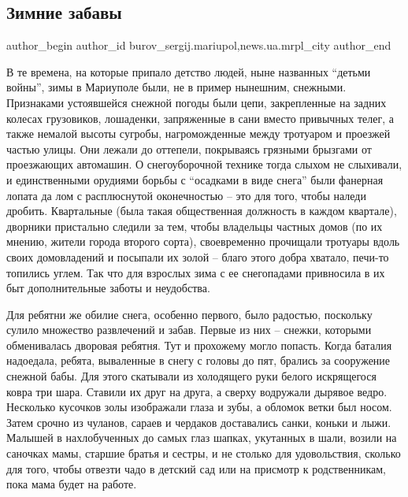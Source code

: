  
 
 
 
 
 
\subsection{Зимние забавы}
\label{sec:20_01_2018.stz.news.ua.mrpl_city.1.zimnie_zabavy}
 
\ifcmt
 author_begin
   author_id burov_sergij.mariupol,news.ua.mrpl_city
 author_end
\fi

В те времена, на которые припало детство людей, ныне названных \enquote{детьми войны},
зимы в Мариуполе были, не в пример нынешним, снежными. Признаками устоявшейся
снежной погоды были цепи, закрепленные на задних колесах грузовиков, лошаденки,
запряженные в сани вместо привычных телег, а также немалой высоты сугробы,
нагроможденные между тротуаром и проезжей частью улицы. Они лежали до оттепели,
покрываясь грязными брызгами от проезжающих автомашин. О снегоуборочной технике
тогда слыхом не слыхивали, и единственными орудиями борьбы с \enquote{осадками в виде
снега} были фанерная лопата да лом с расплюснутой оконечностью – это для того,
чтобы наледи дробить. Квартальные (была такая общественная должность в каждом
квартале), дворники пристально следили за тем, чтобы владельцы частных домов
(по их мнению, жители города второго сорта), своевременно прочищали тротуары
вдоль своих домовладений и посыпали их золой – благо этого добра хватало,
печи-то топились углем. Так что для взрослых зима с ее снегопадами привносила в
их быт дополнительные заботы и неудобства.

Для ребятни же обилие снега, особенно первого, было радостью, поскольку сулило
множество развлечений и забав. Первые из них – снежки, которыми обменивалась
дворовая ребятня. Тут и прохожему могло попасть. Когда баталия надоедала,
ребята, вываленные в снегу с головы до пят, брались за сооружение снежной бабы.
Для этого скатывали из холодящего руки белого искрящегося ковра три шара.
Ставили их друг на друга, а сверху водружали дырявое ведро. Несколько кусочков
золы изображали глаза и зубы, а обломок ветки был носом. Затем срочно из
чуланов, сараев и чердаков доставались санки, коньки и лыжи. Малышей в
нахлобученных до самых глаз шапках, укутанных в шали, возили на саночках мамы,
старшие братья и сестры, и не столько для удовольствия, сколько для того, чтобы
отвезти чадо в детский сад или на присмотр к родственникам, пока мама будет на
работе.

